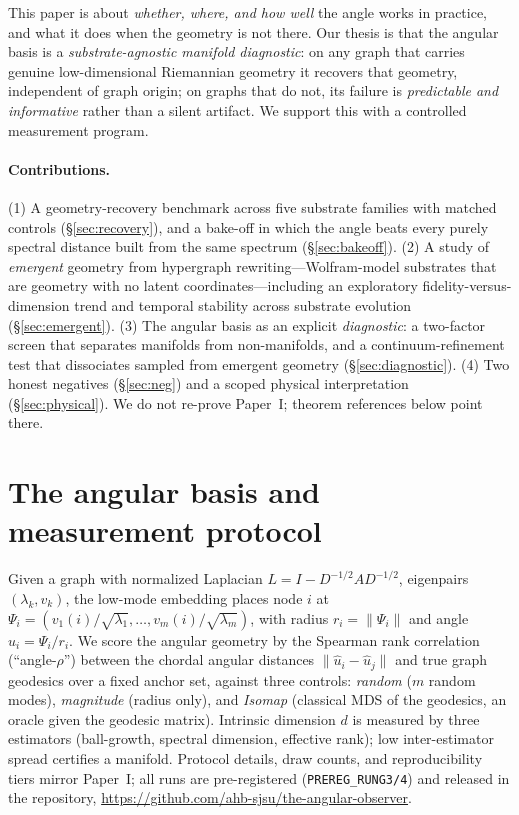\documentclass[11pt]{article}
\begin{document}
This paper is about \emph{whether, where, and how well} the angle works in practice, and
what it does when the geometry is not there. Our thesis is that the angular basis is a
\emph{substrate-agnostic manifold diagnostic}: on any graph that carries genuine
low-dimensional Riemannian geometry it recovers that geometry, independent of graph
origin; on graphs that do not, its failure is \emph{predictable and informative} rather
than a silent artifact. We support this with a controlled measurement program.

\paragraph{Contributions.}
(1) A geometry-recovery benchmark across five substrate families with matched controls
(\S\ref{sec:recovery}), and a bake-off in which the angle beats every purely spectral
distance built from the same spectrum (\S\ref{sec:bakeoff}).
(2) A study of \emph{emergent} geometry from hypergraph rewriting---Wolfram-model
substrates that are geometry with no latent coordinates---including an exploratory
fidelity-versus-dimension trend and temporal stability across substrate evolution
(\S\ref{sec:emergent}).
(3) The angular basis as an explicit \emph{diagnostic}: a two-factor screen that
separates manifolds from non-manifolds, and a continuum-refinement test that dissociates
sampled from emergent geometry (\S\ref{sec:diagnostic}).
(4) Two honest negatives (\S\ref{sec:neg}) and a scoped physical interpretation
(\S\ref{sec:physical}).
We do not re-prove Paper~I; theorem references below point there.

\section{The angular basis and measurement protocol}\label{sec:protocol}
Given a graph with normalized Laplacian $L=I-D^{-1/2}AD^{-1/2}$, eigenpairs
$(\lambda_k,v_k)$, the low-mode embedding places node $i$ at
$\Psi_i=(v_1(i)/\sqrt{\lambda_1},\dots,v_m(i)/\sqrt{\lambda_m})$, with radius
$r_i=\lVert\Psi_i\rVert$ and angle $\hat u_i=\Psi_i/r_i$. We score the angular geometry
by the Spearman rank correlation (``angle-$\rho$'') between the chordal angular distances
$\lVert\hat u_i-\hat u_j\rVert$ and true graph geodesics over a fixed anchor set, against
three controls: \emph{random} ($m$ random modes), \emph{magnitude} (radius only), and
\emph{Isomap} (classical MDS of the geodesics, an oracle given the geodesic matrix).
Intrinsic dimension $d$ is measured by three estimators (ball-growth, spectral dimension,
effective rank); low inter-estimator spread certifies a manifold. Protocol details, draw
counts, and reproducibility tiers mirror Paper~I; all runs are pre-registered
(\texttt{PREREG\_RUNG3/4}) and released in the repository,
\url{https://github.com/ahb-sjsu/the-angular-observer}.
\end{document}
